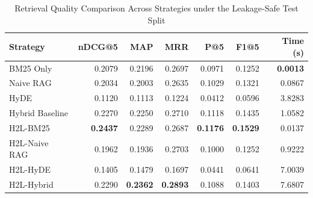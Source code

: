 
\begin{table}[t]
\centering
\caption{Retrieval Quality Comparison Across Strategies under the Leakage-Safe Test Split}
\label{tab:main_comparison}
\begin{tabular}{lrrrrrr}
\toprule
Strategy & nDCG@5 & MAP & MRR & P@5 & F1@5 & Time (s) \\
\midrule
BM25 Only & 0.2079 & 0.2196 & 0.2697 & 0.0971 & 0.1252 & \textbf{0.0013} \\
Naive RAG & 0.2034 & 0.2003 & 0.2635 & 0.1029 & 0.1321 & 0.0867 \\
HyDE & 0.1120 & 0.1113 & 0.1224 & 0.0412 & 0.0596 & 3.8283 \\
Hybrid Baseline & 0.2270 & 0.2250 & 0.2710 & 0.1118 & 0.1435 & 1.0582 \\
H2L-BM25 & \textbf{0.2437} & 0.2289 & 0.2687 & \textbf{0.1176} & \textbf{0.1529} & 0.0137 \\
H2L-Naive RAG & 0.1962 & 0.1936 & 0.2703 & 0.1000 & 0.1252 & 0.9222 \\
H2L-HyDE & 0.1405 & 0.1479 & 0.1697 & 0.0441 & 0.0641 & 7.0039 \\
H2L-Hybrid & 0.2290 & \textbf{0.2362} & \textbf{0.2893} & 0.1088 & 0.1403 & 7.6807 \\
\bottomrule
\end{tabular}
\end{table}

